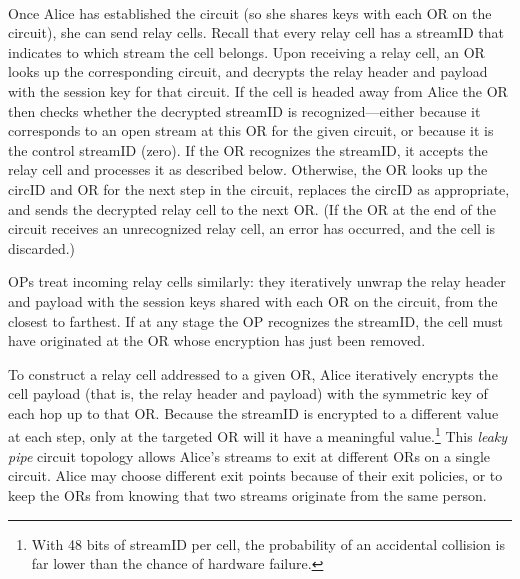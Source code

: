 \documentclass[times,10pt,twocolumn]{article}
\begin{document}
\\
%
Once Alice has established the circuit (so she shares keys with each
OR on the circuit), she can send relay cells.  Recall that every relay
cell has a streamID that indicates to which
stream the cell belongs.  %
Upon receiving a relay
cell, an OR looks up the corresponding circuit, and decrypts the relay
header and payload with the session key for that circuit.
If the cell is headed away from Alice the OR then checks
whether the decrypted streamID is recognized---either because it
corresponds to an open stream at this OR for the given circuit, or because
it is the control streamID (zero).  If the OR recognizes the
streamID, it accepts the relay cell and processes it as described
below.  Otherwise,
the OR looks up the circID and OR for the
next step in the circuit, replaces the circID as appropriate, and
sends the decrypted relay cell to the next OR.  (If the OR at the end
of the circuit receives an unrecognized relay cell, an error has
occurred, and the cell is discarded.)

OPs treat incoming relay cells similarly: they iteratively unwrap the
relay header and payload with the session keys shared with each
OR on the circuit, from the closest to farthest. %
If at any stage the OP recognizes the streamID, the cell must have
originated at the OR whose encryption has just been removed.

To construct a relay cell addressed to a given OR, Alice iteratively
encrypts the cell payload (that is, the relay header and payload) with
the symmetric key of each hop up to that OR.  Because the streamID is
encrypted to a different value at each step, only at the targeted OR
will it have a meaningful value.\footnote{
With 48 bits of streamID per cell, the probability of an accidental
collision is far lower than the chance of hardware failure.}
This \emph{leaky pipe} circuit topology
allows Alice's streams to exit at different ORs on a single circuit.
Alice may choose different exit points because of their exit policies,
or to keep the ORs from knowing that two streams
originate from the same person.
\end{document}
